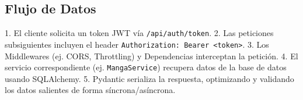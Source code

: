 \subsection{Flujo de Datos}
1. El cliente solicita un token JWT vía \texttt{/api/auth/token}.
2. Las peticiones subsiguientes incluyen el header \texttt{Authorization: Bearer <token>}.
3. Los Middlewares (ej. CORS, Throttling) y Dependencias interceptan la petición.
4. El servicio correspondiente (ej. \texttt{MangaService}) recupera datos de la base de datos usando SQLAlchemy.
5. Pydantic serializa la respuesta, optimizando y validando los datos salientes de forma síncrona/asíncrona.
